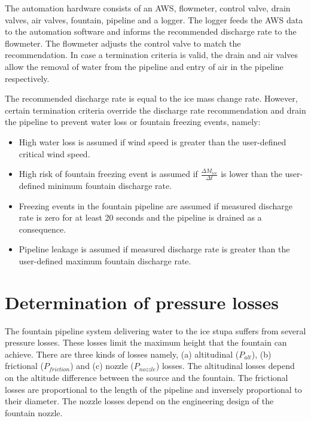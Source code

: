\documentclass[tc, manuscript]{copernicus}
\begin{document}
The automation hardware consists of an AWS, flowmeter, control valve, drain valves, air valves, fountain,
pipeline and a logger. The logger feeds the AWS data to the automation software and informs the recommended
discharge rate to the flowmeter. The flowmeter adjusts the control valve to match the recommendation. In case a
termination criteria is valid, the drain and air valves allow the removal of water from the pipeline and entry
of air in the pipeline respectively.

The recommended discharge rate is equal to the ice mass change rate. However, certain termination criteria
override the discharge rate recommendation and drain the pipeline to prevent water loss or fountain freezing
events, namely: 

\begin{itemize}

\item High water loss is assumed if wind speed is greater than the user-defined critical wind speed.

\item High risk of fountain freezing event is assumed if $\frac{\Delta M_{ice}}{\Delta t}$ is lower than the user-defined minimum fountain discharge rate. 

\item Freezing events in the fountain pipeline are assumed if measured discharge rate is zero for at least 20 seconds and the pipeline is drained as a
  consequence.

\item Pipeline leakage is assumed if measured discharge rate is greater than the user-defined maximum fountain discharge rate.

\end{itemize}

\section{Determination of pressure losses} \label{sec:p_loss}

The fountain pipeline system delivering water to the ice stupa suffers from several pressure losses. These
losses limit the maximum height that the fountain can achieve. There are three kinds of losses namely, (a)
altitudinal ($P_{alt}$), (b) frictional ($P_{friction}$) and (c) nozzle ($P_{nozzle}$) losses. The altitudinal
losses depend on the altitude difference between the source and the fountain. The frictional losses are
proportional to the length of the pipeline and inversely proportional to their diameter. The nozzle losses
depend on the engineering design of the fountain nozzle.
\end{document}
